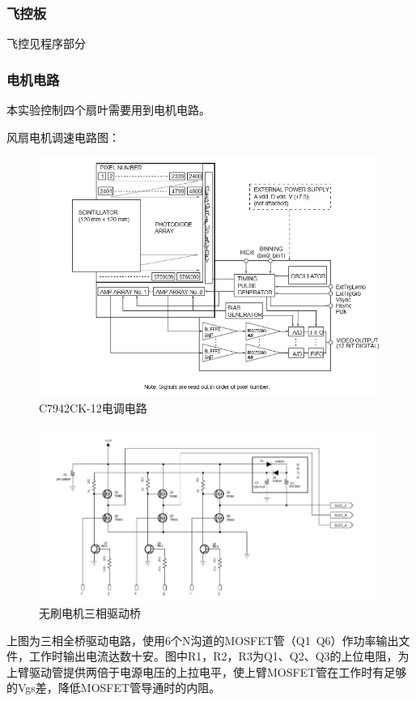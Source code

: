 \documentclass{ctexart}
\begin{document}
\subsubsection{飞控板}
飞控见程序部分
\subsubsection{电机电路}
本实验控制四个扇叶需要用到电机电路。\par
风扇电机调速电路图：
\begin{figure}[H]
\centering
    \includegraphics[width = \textwidth]{031}
    \caption{C7942CK-12电调电路}\par
\end{figure}
\begin{figure}[H]
\centering
    \includegraphics[width = \textwidth]{032}
    \caption{无刷电机三相驱动桥}\par
\end{figure}
上图为三相全桥驱动电路，使用6个N沟道的MOSFET管（Q1~Q6）作功率输出文件，工作时输出电流达数十安。图中R1，R2，R3为Q1、Q2、Q3的上位电阻，为上臂驱动管提供两倍于电源电压的上拉电平，使上臂MOSFET管在工作时有足够的Vgs差，降低MOSFET管导通时的内阻。
\end{document}
